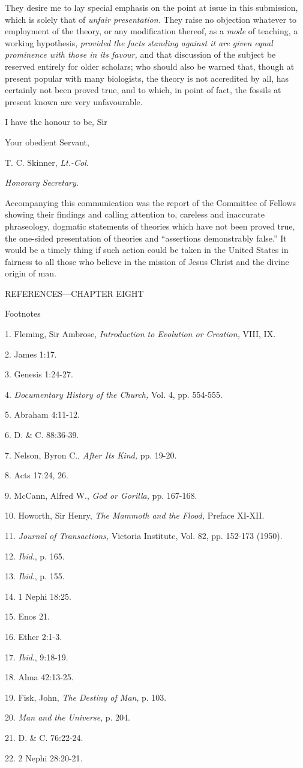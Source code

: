 They desire me to lay special emphasis on the point at issue in this submission, which is
solely that of \textit{unfair presentation.} They raise no objection whatever to employment of the
theory, or any modification thereof, as a \textit{mode} of teaching, a working hypothesis, \textit{provided
the facts standing against it are given equal prominence with those in its favour,} and that
discussion of the subject be reserved entirely for older scholars; who should also be warned
that, though at present popular with many biologists, the theory is not accredited by all, has
certainly not been proved true, and to which, in point of fact, the fossils at present known are
very unfavourable.

I have the honour to be, Sir

Your obedient Servant,

T. C. Skinner, \textit{Lt.-Col.}

\textit{Honorary Secretary.}

Accompanying this communication was the report of the Committee of Fellows showing
their findings and calling attention to, careless and inaccurate phraseology, dogmatic
statements of theories which have not been proved true, the one-sided presentation of
theories and ``assertions demonstrably false.'' It would be a timely thing if such action could
be taken in the United States in fairness to all those who believe in the mission of Jesus
Christ and the divine origin of man.

\newpage
REFERENCES—CHAPTER EIGHT

Footnotes

1. Fleming, Sir Ambrose, \textit{Introduction to Evolution or Creation,} VIII, IX.

2. James 1:17.

3. Genesis 1:24-27.

4. \textit{Documentary History of the Church,} Vol. 4, pp. 554-555.

5. Abraham 4:11-12.

6. D. \& C. 88:36-39.

7. Nelson, Byron C., \textit{After Its Kind,} pp. 19-20.

8. Acts 17:24, 26.

9. McCann, Alfred W., \textit{God or Gorilla,} pp. 167-168.

10. Howorth, Sir Henry, \textit{The Mammoth and the Flood,} Preface XI-XII.

11. \textit{Journal of Transactions,} Victoria Institute, Vol. 82, pp. 152-173 (1950).

12. \textit{Ibid}., p. 165.

13. \textit{Ibid}., p. 155.

14. 1 Nephi 18:25.

15. Enos 21.

16. Ether 2:1-3.

17. \textit{Ibid}., 9:18-19.

18. Alma 42:13-25.

19. Fisk, John, \textit{The Destiny of Man}, p. 103.

20. \textit{Man and the Universe}, p. 204.

21. D. \& C. 76:22-24.

22. 2 Nephi 28:20-21.

